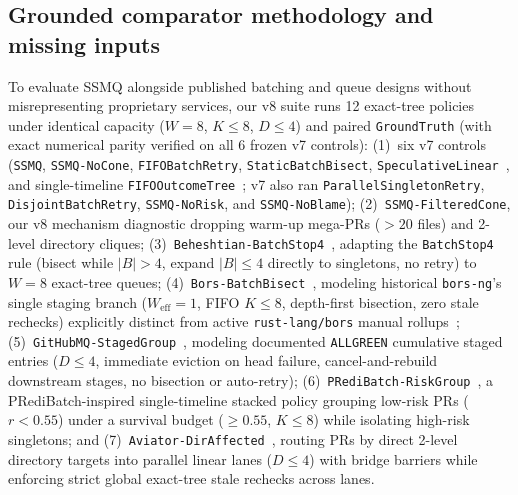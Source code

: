 \subsection{Grounded comparator methodology and missing inputs}
To evaluate SSMQ alongside published batching and queue designs without misrepresenting proprietary services, our v8 suite runs 12 exact-tree policies under identical capacity ($W{=}8$, $K{\le}8$, $D{\le}4$) and paired \texttt{GroundTruth} (with exact numerical parity verified on all 6 frozen v7 controls):
(1)~six v7 controls (\texttt{SSMQ}, \texttt{SSMQ-NoCone}, \texttt{FIFOBatchRetry}, \texttt{StaticBatchBisect}, \texttt{SpeculativeLinear}~\cite{zuul2026gating}, and single-timeline \texttt{FIFOOutcomeTree}~\cite{ananthanarayanan2019keeping}; v7 also ran \texttt{ParallelSingletonRetry}, \texttt{DisjointBatchRetry}, \texttt{SSMQ-NoRisk}, and \texttt{SSMQ-NoBlame});
(2)~\texttt{SSMQ-FilteredCone}, our v8 mechanism diagnostic dropping warm-up mega-PRs ($>20$ files) and 2-level directory cliques;
(3)~\texttt{Beheshtian-BatchStop4}~\cite{beheshtian2022software}, adapting the \texttt{BatchStop4} rule (bisect while $|B|>4$, expand $|B|\le 4$ directly to singletons, no retry) to $W{=}8$ exact-tree queues;
(4)~\texttt{Bors-BatchBisect}~\cite{borsng2023}, modeling historical \texttt{bors-ng}'s single staging branch ($W_{\text{eff}}{=}1$, FIFO $K{\le}8$, depth-first bisection, zero stale rechecks) explicitly distinct from active \texttt{rust-lang/bors} manual rollups~\cite{rustbors2026};
(5)~\texttt{GitHubMQ-StagedGroup}~\cite{github2026mergequeue}, modeling documented \texttt{ALLGREEN} cumulative staged entries ($D{\le}4$, immediate eviction on head failure, cancel-and-rebuild downstream stages, no bisection or auto-retry);
(6)~\texttt{PRediBatch-RiskGroup}~\cite{jungwirth2026predictive}, a PRediBatch-inspired single-timeline stacked policy grouping low-risk PRs ($r<0.55$) under a survival budget ($\ge 0.55$, $K{\le}8$) while isolating high-risk singletons; and
(7)~\texttt{Aviator-DirAffected}~\cite{aviator2026targets}, routing PRs by direct 2-level directory targets into parallel linear lanes ($D{\le}4$) with bridge barriers while enforcing strict global exact-tree stale rechecks across lanes.

